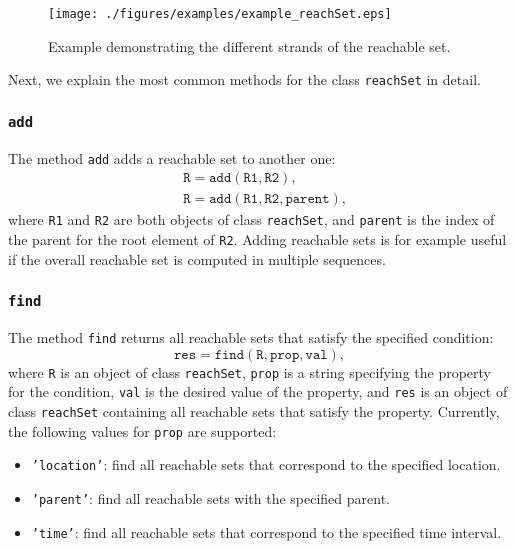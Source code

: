 \begin{figure}[htb]	
\begin{center}
	\texttt{[image: ./figures/examples/example\_reachSet.eps]}	
	\caption{Example demonstrating the different strands of the reachable set.}
	\label{fig:reachSet}
	\end{center}
\end{figure}


Next, we explain the most common methods for the class \texttt{reachSet} in detail.



\subsubsection{\texttt{add}}

The method \texttt{add} adds a reachable set to another one:
\begin{equation*}
\begin{split}
	& \texttt{R} = \texttt{add}(\texttt{R1},\texttt{R2}), \\
	& \texttt{R} = \texttt{add}(\texttt{R1},\texttt{R2},\texttt{parent}),
\end{split}
\end{equation*}
where \texttt{R1} and \texttt{R2} are both objects of class \texttt{reachSet}, and \texttt{parent} is the index of the parent for the root element of \texttt{R2}. Adding reachable sets is for example useful if the overall reachable set is computed in multiple sequences.

\subsubsection{\texttt{find}}

The method \texttt{find} returns all reachable sets that satisfy the specified condition:
\begin{equation*}
	\texttt{res} = \texttt{find}(\texttt{R},\texttt{prop},\texttt{val}),
\end{equation*}
where \texttt{R} is an object of class \texttt{reachSet}, \texttt{prop} is a string specifying the property for the condition, \texttt{val} is the desired value of the property, and \texttt{res} is an object of class \texttt{reachSet} containing all reachable sets that satisfy the property.  Currently, the following values for \texttt{prop} are supported:
\begin{itemize}
	\item \texttt{'location'}: find all reachable sets that correspond to the specified location.
	\item \texttt{'parent'}: find all reachable sets with the specified parent.
	\item \texttt{'time'}: find all reachable sets that correspond to the specified time interval.
\end{itemize}


